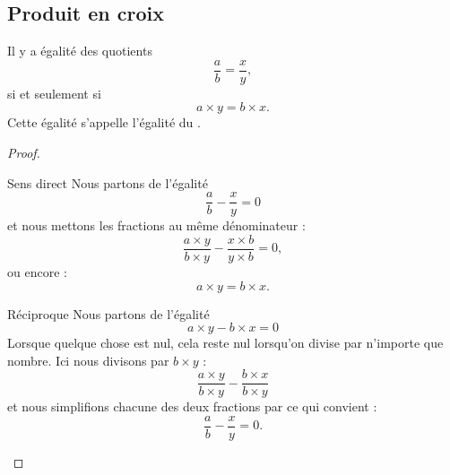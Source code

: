 \subsection{Produit en croix}



\begin{propriete}
    Il y a égalité des quotients
    \begin{equation}
        \frac{ a }{ b }=\frac{ x }{ y },
    \end{equation}
    si et seulement si
    \begin{equation}
        a\times y=b\times x.
    \end{equation}
    Cette égalité s'appelle l'égalité du .
\end{propriete}

\begin{proof}
    \begin{subproof}
        \item[Sens direct]
            Nous partons de l'égalité
            \begin{equation}
                \frac{ a }{ b }-\frac{ x }{ y }=0
            \end{equation}
            et nous mettons les fractions au même dénominateur :
            \begin{equation}
                \frac{ a\times y }{ b\times y }-\frac{ x\times b }{ y\times b }=0,
            \end{equation}
            ou encore :
            \begin{equation}
                a\times y=b\times x.
            \end{equation}
        \item[Réciproque]
            Nous partons de l'égalité
            \begin{equation}
                a\times y-b\times x=0
            \end{equation}
            Lorsque quelque chose est nul, cela reste nul lorsqu'on divise par n'importe que nombre. Ici nous divisons par \( b\times y\) :
            \begin{equation}
                \frac{ a\times y }{ b\times y }-\frac{ b\times x }{ b\times y }
            \end{equation}
            et nous simplifions chacune des deux fractions par ce qui convient :
            \begin{equation}
                \frac{ a }{ b }-\frac{ x }{ y }=0.
            \end{equation}
    \end{subproof}
\end{proof}

